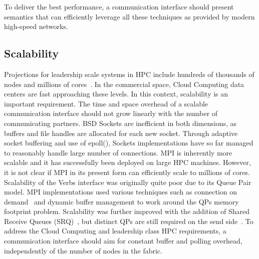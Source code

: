 To deliver the best performance, a communication interface should present
semantics that can efficiently leverage all these techniques as provided by 
modern high-speed networks.

\subsection{Scalability}
Projections for leadership scale systems in HPC include hundreds of thousands of nodes 
and millions of cores~\cite{dongarra:exascale-talk-2010}. In the commercial 
space, Cloud Computing data centers are fast approaching these levels. 
In this context, scalability is an important requirement. The time and space 
overhead of a scalable communication interface should not grow linearly with 
the number of communicating partners. BSD Sockets are inefficient in both 
dimensions, as buffers and file handles are allocated for each new socket. 
Through adaptive socket buffering and use of epoll(), Sockets implementations 
have so far managed to reasonably handle large number of connections. 
MPI is inherently more scalable and it has successfully been deployed on large 
HPC machines. However, it is not clear if MPI in its present form can 
efficiently scale to millions of cores. 
Scalability of the Verbs interface was originally quite poor due to its Queue 
Pair model. MPI implementations used various techniques such as connection on 
demand~\cite{Shipman_infinibandscalability} and dynamic buffer management 
to work around the QPs memory footprint problem. Scalability was further
improved with the addition of Shared Receive Queues 
(SRQ)~\cite{shipman07:_inves_infin}, but distinct QPs are still  
required on the send side~\cite{Shipman:2008:XIS:1431669.1431683}. To
address the Cloud Computing and leadership class HPC requirements, a
communication interface should aim for constant buffer and polling
overhead, independently of the number of nodes in the fabric. 

